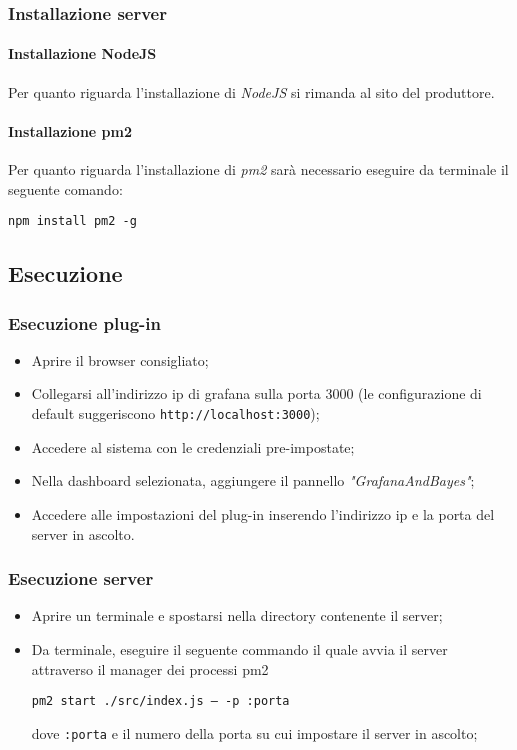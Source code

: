 \subsubsection{Installazione server}\label{installazione_server}
\paragraph{Installazione NodeJS}
Per quanto riguarda l'installazione di \textit{NodeJS} si rimanda al sito del produttore.

\paragraph{Installazione pm2}
Per quanto riguarda l'installazione di \textit{pm2} sarà necessario eseguire da terminale il seguente comando:
\begin{center}
	\texttt{npm install pm2 -g}
\end{center}
	
	
\subsection{Esecuzione}\label{run}
\subsubsection{Esecuzione plug-in}
\begin{itemize}
	\item Aprire il browser consigliato; 
	\item Collegarsi all'indirizzo ip di grafana sulla porta 3000 (le configurazione di default suggeriscono \texttt{http://localhost:3000}); 
	\item Accedere al sistema con le credenziali pre-impostate; 
	\item Nella dashboard selezionata, aggiungere il pannello \textit{"GrafanaAndBayes"}; 
	\item Accedere alle impostazioni del plug-in inserendo l'indirizzo ip e la porta del server in ascolto. 
\end{itemize}


\subsubsection{Esecuzione server}
\begin{itemize}
	\item Aprire un terminale e spostarsi nella directory contenente il server; 
	\item Da terminale, eseguire il seguente commando il quale avvia il server attraverso il manager dei processi pm2
	\begin{center}
		\texttt{pm2 start ./src/index.js --- -p :porta}
	\end{center}
	dove \texttt{:porta} e il numero della porta su cui impostare il server in ascolto; 
\end{itemize}
	